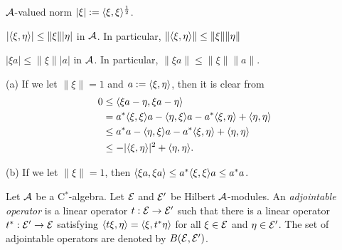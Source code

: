 \documentclass{../../small}
\begin{document}
\begin{prop}
$\mathcal{A}$-valued norm $|\xi|:=\langle\xi,\xi\rangle^{\frac12}$.
\begin{parts}
\item $|\langle\xi,\eta\rangle|\le\|\xi\||\eta|$ in $\mathcal{A}$. In particular, $\|\langle\xi,\eta\rangle\|\le\|\xi\|\|\eta\|$
\item $|\xi a|\le\|\xi\||a|$ in $\mathcal{A}$. In particular, $\|\xi a\|\le\|\xi\|\|a\|$.
\end{parts}
\end{prop}
\begin{pf}
(a)
If we let $\|\xi\|=1$ and $a:=\langle\xi,\eta\rangle$, then it is clear from
\begin{align*}
0&\le\langle\xi a-\eta,\xi a-\eta\rangle\\
&=a^*\langle\xi,\xi\rangle a-\langle\eta,\xi\rangle a-a^*\langle\xi,\eta\rangle+\langle\eta,\eta\rangle\\
&\le a^*a-\langle\eta,\xi\rangle a-a^*\langle\xi,\eta\rangle+\langle\eta,\eta\rangle\\
&\le-|\langle\xi,\eta\rangle|^2+\langle\eta,\eta\rangle.
\end{align*}

(b)
If we let $\|\xi\|=1$, then $\langle\xi a,\xi a\rangle\le a^*\langle\xi,\xi\rangle a\le a^*a$.
\end{pf}

\begin{defn}
Let $\mathcal{A}$ be a C$^*$-algebra.
Let $\mathcal{E}$ and $\mathcal{E}'$ be Hilbert $\mathcal{A}$-modules.
An \emph{adjointable operator} is a linear operator $t:\mathcal{E}\to\mathcal{E}'$ such that there is a linear operator $t^*:\mathcal{E}'\to\mathcal{E}$ satisfying $\langle t\xi,\eta\rangle=\langle\xi,t^*\eta\rangle$ for all $\xi\in\mathcal{E}$ and $\eta\in\mathcal{E}'$.
The set of adjointable operators are denoted by $B(\mathcal{E},\mathcal{E}')$.
\end{defn}
\end{document}
